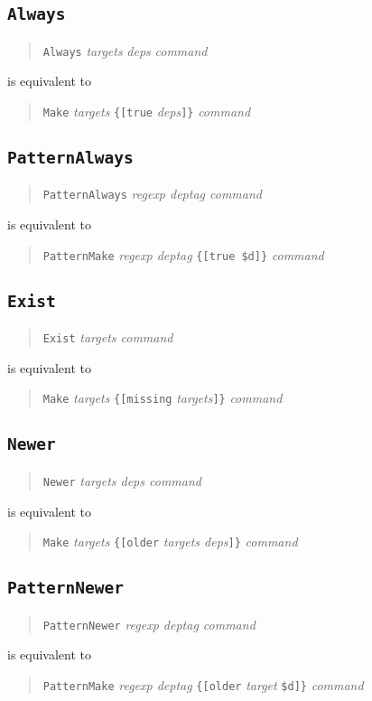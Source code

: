 \documentclass[11pt]{scrartcl}
\begin{document}
\subsection{\texttt{Always}}
\begin{quote}
  \texttt{Always} \textit{targets} \textit{deps }\textit{command}
\end{quote}
is equivalent to
\begin{quote}
  \texttt{Make} \textit{targets} 
   \texttt{\{[true} \textit{deps}\texttt{]\}} \textit{command}
\end{quote}

\subsection{\texttt{PatternAlways}}
\begin{quote}
  \texttt{PatternAlways} \textit{regexp deptag command}
\end{quote}
is equivalent to
\begin{quote}
  \texttt{PatternMake} \textit{regexp deptag}
  \texttt{\{[true \$d]\}} \textit{command}
\end{quote}

\subsection{\texttt{Exist}}
\begin{quote}
  \texttt{Exist} \textit{targets command}
\end{quote}
is equivalent to
\begin{quote}
  \texttt{Make} \textit{targets}
  \texttt{\{[missing} \textit{targets}\texttt{]\}} \textit{command}
\end{quote}

\subsection{\texttt{Newer}}
\begin{quote}
  \texttt{Newer} \textit{targets deps command}
\end{quote}
is equivalent to
\begin{quote}
  \texttt{Make} \textit{targets} 
  \texttt{\{[older} \textit{targets deps}\texttt{]\}} \textit{command}
\end{quote}

\subsection{\texttt{PatternNewer}}
\begin{quote}
  \texttt{PatternNewer} \textit{regexp deptag command}
\end{quote}
is equivalent to
\begin{quote}
  \texttt{PatternMake} \textit{regexp deptag}
  \texttt{\{[older} \textit{target} \texttt{\$d]\}} \textit{command}
\end{quote}
\end{document}
